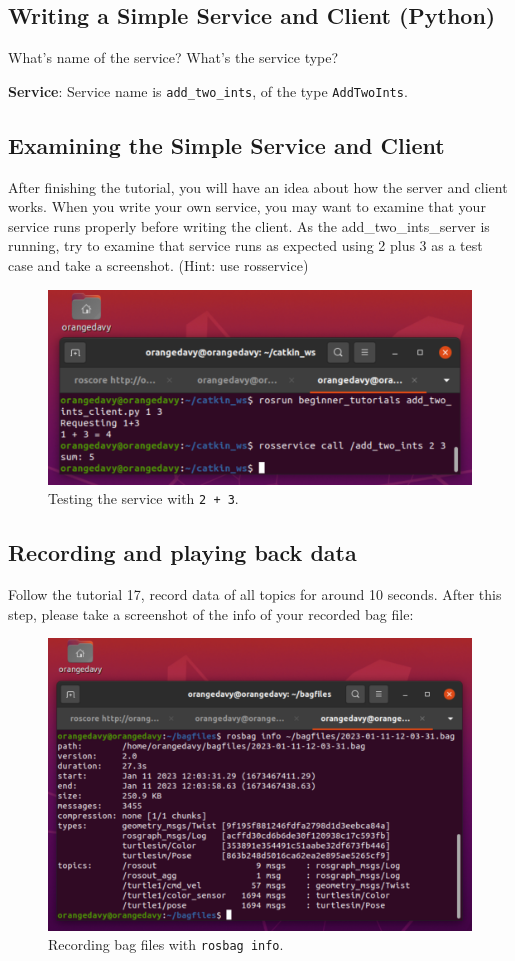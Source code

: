 \documentclass[12pt]{article}
\begin{document}
\subsection{Writing a Simple Service and Client (Python)}
What's name of the service? What's the service type?

\textbf{Service}: Service name is \texttt{add_two_ints}, of the type \texttt{AddTwoInts}.

\subsection{Examining the Simple Service and Client}
After finishing the tutorial, you will have an idea about how the server and client works. When you write your own service, you may want to examine that your service runs properly before writing the client. As the add\_two\_ints\_server is running, try to examine that service runs as expected using 2 plus 3 as a test case and take a screenshot. (Hint: use rosservice)

\begin{figure}[H]
  \centering\includegraphics[width=14cm]{images/add_two_ints.png}\vspace{-10pt}
  \caption{Testing the service with \texttt{2 + 3}.}\label{fig:add_two_ints}
  \end{figure}

\subsection{Recording and playing back data}
Follow the tutorial 17, record data of all topics for around 10 seconds. After this step, please take a screenshot of the info of your recorded bag file:

\begin{figure}[H]
  \centering\includegraphics[width=14cm]{images/rosbag_info.png}\vspace{-10pt}
  \caption{Recording bag files with \texttt{rosbag info}.}\label{fig:rosbag_info}
  \end{figure}
\end{document}
